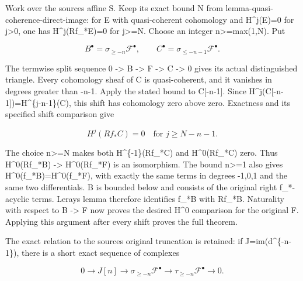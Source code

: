 \documentclass[11pt]{article}
\begin{document}
Work over the source\textquotesingle s affine S. Keep its exact bound N from lemma-quasi-coherence-direct-image:\allowbreak{} for E with quasi-coherent cohomology and H\textasciicircum{}j(E)\allowbreak{}\allowbreak{}=0 for j>0,\allowbreak{} one has H\textasciicircum{}j(Rf\_\allowbreak{}*E)\allowbreak{}\allowbreak{}=0 for j>\allowbreak{}=N. Choose an integer n>\allowbreak{}=max(1,\allowbreak{}N)\allowbreak{}. Put

\[
 B^\bullet=\sigma_{\ge -n}\mathcal F^\bullet,
 \qquad C^\bullet=\sigma_{\le -n-1}\mathcal F^\bullet.
\]

The termwise split sequence 0 \allowbreak{}-> B \allowbreak{}-> F \allowbreak{}-> C \allowbreak{}-> 0 gives its actual distinguished triangle. Every cohomology sheaf of C is quasi-coherent,\allowbreak{} and it vanishes in degrees greater than -n-1. Apply the stated bound to C[-n-1]\allowbreak{}. Since H\textasciicircum{}j(C[-n-1]\allowbreak{})\allowbreak{}\allowbreak{}=H\textasciicircum{}\{j-n-1\}(C)\allowbreak{},\allowbreak{} this shift has cohomology zero above zero. Exactness and its specified shift comparison give

\[
 H^j(Rf_*C)=0\quad\text{for }j\ge N-n-1.                 \tag{7.2}
\]

The choice n>\allowbreak{}=N makes both H\textasciicircum{}\{-1\}(Rf\_\allowbreak{}*C)\allowbreak{} and H\textasciicircum{}0(Rf\_\allowbreak{}*C)\allowbreak{} zero. Thus H\textasciicircum{}0(Rf\_\allowbreak{}*B)\allowbreak{} \allowbreak{}-> H\textasciicircum{}0(Rf\_\allowbreak{}*F)\allowbreak{} is an isomorphism. The bound n>\allowbreak{}=1 also gives H\textasciicircum{}0(f\_\allowbreak{}*B)\allowbreak{}\allowbreak{}=H\textasciicircum{}0(f\_\allowbreak{}*F)\allowbreak{},\allowbreak{} with exactly the same terms in degrees -1,\allowbreak{}0,\allowbreak{}1 and the same two differentials. B is bounded below and consists of the original right f\_\allowbreak{}*-acyclic terms. Leray\textquotesingle s lemma therefore identifies f\_\allowbreak{}*B with Rf\_\allowbreak{}*B. Naturality with respect to B \allowbreak{}-> F now proves the desired H\^{}0 comparison for the original F. Applying this argument after every shift proves the full theorem.

The exact relation to the source\textquotesingle s original truncation is retained:\allowbreak{} if J\allowbreak{}=im(d\textasciicircum{}\{-n-1\})\allowbreak{},\allowbreak{} there is a short exact sequence of complexes

\[
 0\to J[n]\to\sigma_{\ge -n}\mathcal F^\bullet
               \to\tau_{\ge -n}\mathcal F^\bullet\to0.       \tag{7.3}
\]
\end{document}
